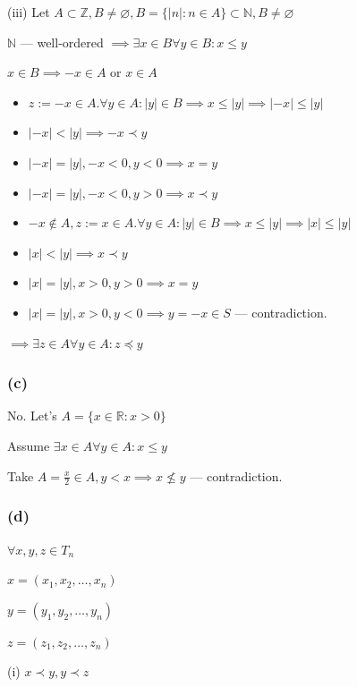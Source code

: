 \documentclass{article}
\begin{document}
(iii) Let \( A \subset \mathbb{Z}, B \neq \varnothing, B = \{ |n|: n \in A \} \subset \mathbb{N}, B \neq \varnothing \)

\( \mathbb{N} \) --- well-ordered \( \implies \exists x \in B \forall y \in B: x \leq y \)

\( x \in B \implies -x \in A \) or \( x \in A \)

\begin{itemize}
\item \( z := -x \in A. \forall y \in A: |y| \in B \implies x \leq |y| \implies |-x| \leq |y| \)
\item \( |-x| < |y| \implies -x \prec y \)
\item \( |-x|=|y|, -x < 0, y < 0 \implies x = y \)
\item \( |-x|=|y|, -x < 0, y > 0 \implies x \prec y \)
\item \( -x \notin A, z := x \in A. \forall y \in A: |y| \in B \implies x \leq |y| \implies |x| \leq |y| \)
\item \( |x| < |y| \implies x \prec y \)
\item \( |x|=|y|, x > 0, y > 0 \implies x = y \)
\item \( |x|=|y|, x > 0, y < 0 \implies y=-x \in S \) --- contradiction.
\end{itemize}

\( \implies \exists z \in A \forall y \in A: z \preceq y \)

\subsubsection*{(c)}

No. Let's \( A = \{ x \in \mathbb{R}: x > 0 \} \)

Assume \( \exists x \in A \forall y \in A: x \leq y \)

Take \( A = \frac{x}{2} \in A, y < x \implies x \not\leq y \) --- contradiction.

\subsubsection*{(d)}

\( \forall x, y, z \in T_{n} \)

\( x = (x_{1},x_{2},\ldots,x_{n}) \)

\( y = (y_{1},y_{2},\ldots,y_{n}) \)

\( z = (z_{1},z_{2},\ldots,z_{n}) \)

(i) \( x \prec y, y \prec z \)
\end{document}
